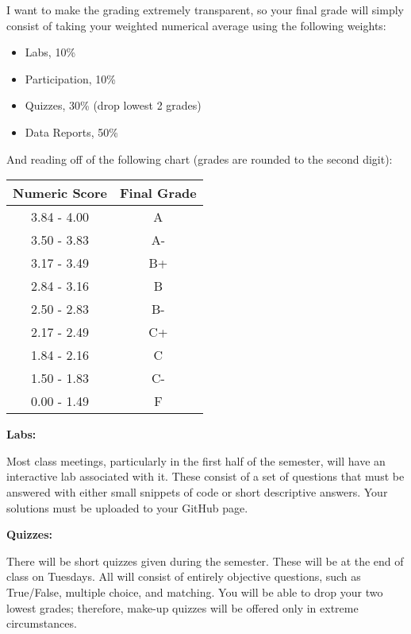\documentclass[12pt]{article}
\begin{document}
I want to make the grading extremely transparent, so your final grade will
simply consist of taking your weighted numerical average using the following
weights:

\begin{itemize}\setlength\itemsep{0em}
\item Labs, 10\%
\item Participation, 10\%
\item Quizzes, 30\% (drop lowest 2 grades)
\item Data Reports, 50\%
\end{itemize}

And reading off of the following chart (grades are rounded to the
second digit):

\begin{center}
\begin{tabular}{c || c}
Numeric Score & Final Grade \\
\hline \hline
3.84 - 4.00 & A  \\
3.50 - 3.83 & A- \\
3.17 - 3.49 & B+ \\
2.84 - 3.16 & B  \\
2.50 - 2.83 & B- \\
2.17 - 2.49 & C+ \\
1.84 - 2.16 & C  \\
1.50 - 1.83 & C- \\
0.00 - 1.49 & F
\end{tabular}
\end{center}

\newpage

\textbf{Labs:} \vspace{6pt}

Most class meetings, particularly in the first half of the semester,
will have an interactive lab associated with it. These consist of a
set of questions that must be answered with either small snippets of
code or short descriptive answers. Your solutions must be uploaded
to your GitHub page.

\vspace{0.4cm}

\textbf{Quizzes:} \vspace{6pt}

There will be short quizzes given during the semester. These will be
at the end of class on Tuesdays. All will consist of entirely objective
questions, such as True/False, multiple choice, and matching.
You will be able to drop your two lowest grades; therefore,
make-up quizzes will be offered only in extreme circumstances.
\end{document}
